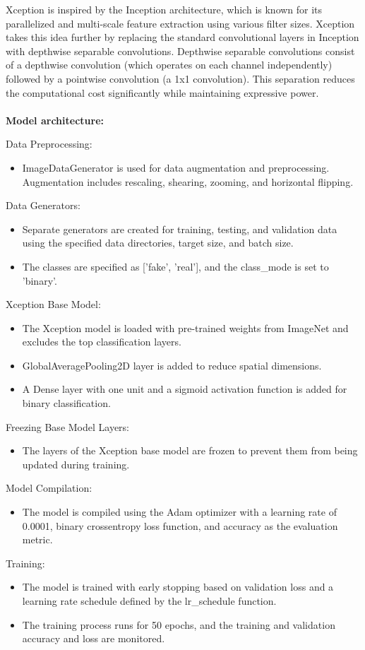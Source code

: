 \documentclass{article}
\begin{document}
Xception is inspired by the Inception architecture, which is known for its parallelized and multi-scale feature extraction using various filter sizes. Xception takes this idea further by replacing the standard convolutional layers in Inception with depthwise separable convolutions. Depthwise separable convolutions consist of a depthwise convolution (which operates on each channel independently) followed by a pointwise convolution (a 1x1 convolution). This separation reduces the computational cost significantly while maintaining expressive power.

\paragraph{}
\textbf{Model architecture:}

Data Preprocessing:
\begin{itemize}
    \item ImageDataGenerator is used for data augmentation and preprocessing. Augmentation includes rescaling, shearing, zooming, and horizontal flipping.
\end{itemize}
Data Generators:
\begin{itemize}
    \item Separate generators are created for training, testing, and validation data using the specified data directories, target size, and batch size.
    \item The classes are specified as ['fake', 'real'], and the class\_mode is set to 'binary'.
\end{itemize}
Xception Base Model:
\begin{itemize}
    \item The Xception model is loaded with pre-trained weights from ImageNet and excludes the top classification layers.
    \item GlobalAveragePooling2D layer is added to reduce spatial dimensions.
    \item A Dense layer with one unit and a sigmoid activation function is added for binary classification.
\end{itemize}
Freezing Base Model Layers:
\begin{itemize}
    \item The layers of the Xception base model are frozen to prevent them from being updated during training.
\end{itemize}
Model Compilation:
\begin{itemize}
    \item The model is compiled using the Adam optimizer with a learning rate of 0.0001, binary crossentropy loss function, and accuracy as the evaluation metric.
\end{itemize}
Training:
\begin{itemize}
    \item The model is trained with early stopping based on validation loss and a learning rate schedule defined by the lr\_schedule function.
    \item The training process runs for 50 epochs, and the training and validation accuracy and loss are monitored.
\end{itemize}
\end{document}
